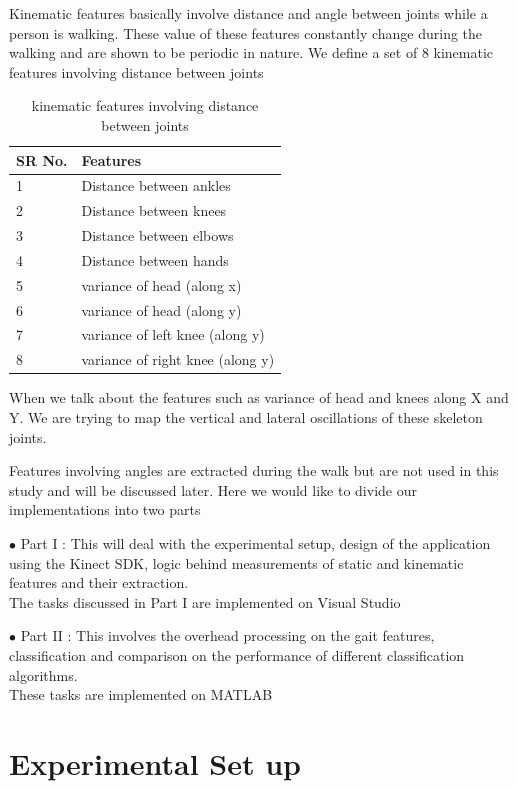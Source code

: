 \noindent Kinematic features basically involve distance and angle between joints while a person is walking. These value of these features constantly change during the walking and are shown to be periodic in nature.
We define a set of 8 kinematic features involving distance between joints 

\begin{table}
\centering
\begin{tabular}{| l | |p{6cm}|}
 \hline
SR No. & Features  \\ \hline
1 & Distance between ankles \\ \hline
2 & Distance between knees \\ \hline
3 & Distance between elbows \\\hline
4 & Distance between hands \\ \hline
5 & variance of head (along x) \\ \hline
6 & variance of head (along y) \\\hline
7 & variance of left knee (along y) \\ \hline
8 & variance of right knee (along y) \\ \hline
\end{tabular}
\caption{ kinematic features involving distance between joints}
\end{table}

\noindent When we talk about the features such as variance of head and knees along X and Y. We are trying to map the vertical and lateral oscillations of these skeleton joints.

\noindent Features involving angles are extracted during the walk but are not used in this study and will be discussed later. Here we would like to divide our implementations into two parts

\noindent$\bullet$ Part I  : This will deal with the experimental setup, design of the application using the Kinect SDK, logic behind measurements of static and kinematic features and their extraction.\\
The tasks discussed in Part I are implemented on Visual Studio

\noindent$\bullet$ Part II  : This involves the overhead processing on the gait features, classification and comparison on the performance of different classification algorithms.\\
These tasks are implemented on MATLAB


\section{Experimental Set up } \label{Experimental Set up }

